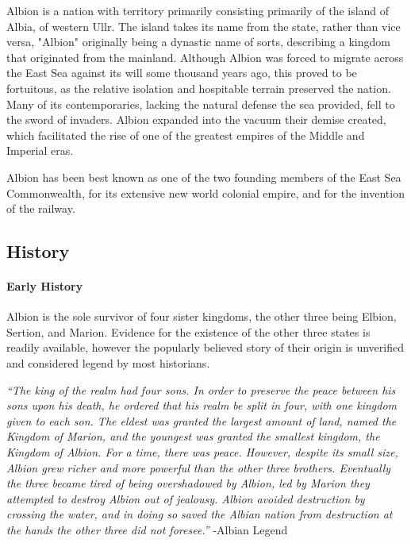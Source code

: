 
	Albion is a nation with territory primarily consisting primarily of the island of Albia, of western Ullr.  The island takes its name from the state, rather than vice versa, "Albion" originally being a dynastic name of sorts, describing a kingdom that originated from the mainland.  Although Albion was forced to migrate across the East Sea against its will some thousand years ago, this proved to be fortuitous, as the relative isolation and hospitable terrain preserved the nation.  Many of its contemporaries, lacking the natural defense the sea provided, fell to the sword of invaders.  Albion expanded into the vacuum their demise created, which facilitated the rise of one of the greatest empires of the Middle and Imperial eras.

	Albion has been best known as one of the two founding members of the East Sea Commonwealth, for its extensive new world colonial empire, and for the invention of the railway.
	
\subsection{History} 
	
	\paragraph{Early History}
	Albion is the sole survivor of four sister kingdoms, the other three being Elbion, Sertion, and Marion.  Evidence for the existence of the other three states is readily available, however the popularly believed story of their origin is unverified and considered legend by most historians.

	\textit{``The king of the realm had four sons.  In order to preserve the peace between his sons upon his death, he ordered that his realm be split in four, with one kingdom given to each son.  The eldest was granted the largest amount of land, named the Kingdom of Marion, and the youngest was granted the smallest kingdom, the Kingdom of Albion.  For a time, there was peace.  However, despite its small size, Albion grew richer and more powerful than the other three brothers.  Eventually the three became tired of being overshadowed by Albion, led by Marion they attempted to destroy Albion out of jealousy.  Albion avoided destruction by crossing the water, and in doing so saved the Albian nation from destruction at the hands the other three did not foresee.''} -Albian Legend

